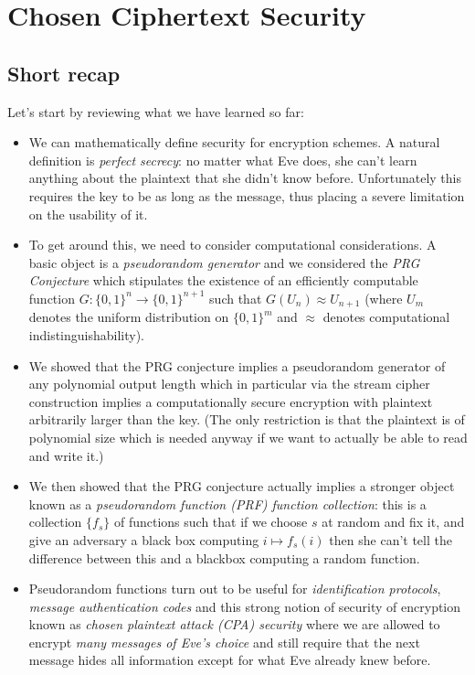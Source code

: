 \chapter{Chosen Ciphertext Security}\label{6-Chosen-Ciphertext-Secu}

\section{Short recap}\label{6-Short-recap}

Let's start by reviewing what we have learned so far:

\begin{itemize}
\item
  We can mathematically define security for encryption schemes. A
  natural definition is \emph{perfect secrecy}: no matter what Eve does,
  she can't learn anything about the plaintext that she didn't know
  before. Unfortunately this requires the key to be as long as the
  message, thus placing a severe limitation on the usability of it.
\item
  To get around this, we need to consider computational considerations.
  A basic object is a \emph{pseudorandom generator} and we considered
  the \emph{PRG Conjecture} which stipulates the existence of an
  efficiently computable function
  \(G:\{0,1\}^n\rightarrow\{0,1\}^{n+1}\) such that
  \(G(U_n)\approx U_{n+1}\) (where \(U_m\) denotes the uniform
  distribution on \(\{0,1\}^m\) and \(\approx\) denotes computational
  indistinguishability).
\item
  We showed that the PRG conjecture implies a pseudorandom generator of
  any polynomial output length which in particular via the stream cipher
  construction implies a computationally secure encryption with
  plaintext arbitrarily larger than the key. (The only restriction is
  that the plaintext is of polynomial size which is needed anyway if we
  want to actually be able to read and write it.)
\item
  We then showed that the PRG conjecture actually implies a stronger
  object known as a \emph{pseudorandom function (PRF) function
  collection}: this is a collection \(\{ f_s \}\) of functions such that
  if we choose \(s\) at random and fix it, and give an adversary a black
  box computing \(i \mapsto f_s(i)\) then she can't tell the difference
  between this and a blackbox computing a random function.
\item
  Pseudorandom functions turn out to be useful for \emph{identification
  protocols}, \emph{message authentication codes} and this strong notion
  of security of encryption known as \emph{chosen plaintext attack (CPA)
  security} where we are allowed to encrypt \emph{many messages of Eve's
  choice} and still require that the next message hides all information
  except for what Eve already knew before.
\end{itemize}

